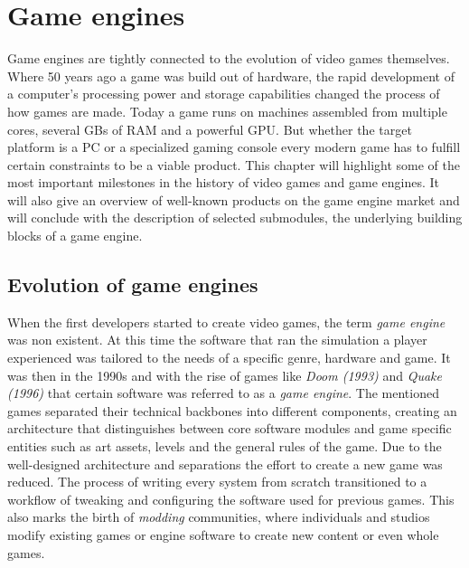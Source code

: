 \chapter{Game engines}

Game engines are tightly connected to the evolution of video games themselves. Where 50 years ago a game was build out of hardware, the rapid development of a computer's processing power and storage capabilities changed the process of how games are made. Today a game runs on machines assembled from multiple cores, several \acp{GB} of \ac{RAM} and a powerful \ac{GPU}. But whether the target platform is a PC or a specialized gaming console every modern game has to fulfill certain constraints to be a viable product. This chapter will highlight some of the most important milestones in the history of video games and game engines. It will also give an overview of well-known products on the game engine market and will conclude with the description of selected submodules, the underlying building blocks of a game engine.

\section{Evolution of game engines}

When the first developers started to create video games, the term \textit{game engine} was non existent. At this time the software that ran the simulation a player experienced was tailored to the needs of a specific genre, hardware and game. It was then in the 1990s and with the rise of games like \textit{Doom (1993)} and \textit{Quake (1996)} that certain software was referred to as a \textit{game engine}. The mentioned games separated their technical backbones into different components, creating an architecture that distinguishes between core software modules and game specific entities such as art assets, levels and the general rules of the game. Due to the well-designed architecture and separations the effort to create a new game was reduced. The process of writing every system from scratch transitioned to a workflow of tweaking and configuring the software used for previous games. This also marks the birth of \textit{modding} communities, where individuals and studios modify existing games or engine software to create new content or even whole games.

